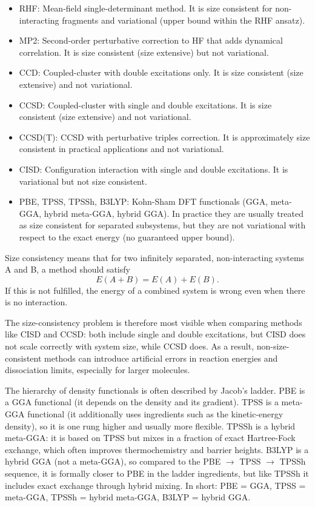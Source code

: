 \documentclass[a4paper,12pt]{scrartcl}
\begin{document}
\begin{itemize}
    \item RHF: Mean-field single-determinant method. It is size consistent for non-interacting fragments and variational (upper bound within the RHF ansatz).
    \item MP2: Second-order perturbative correction to HF that adds dynamical correlation. It is size consistent (size extensive) but not variational.
    \item CCD: Coupled-cluster with double excitations only. It is size consistent (size extensive) and not variational.
    \item CCSD: Coupled-cluster with single and double excitations. It is size consistent (size extensive) and not variational.
    \item CCSD(T): CCSD with perturbative triples correction. It is approximately size consistent in practical applications and not variational.
    \item CISD: Configuration interaction with single and double excitations. It is variational but not size consistent.
    \item PBE, TPSS, TPSSh, B3LYP: Kohn-Sham DFT functionals (GGA, meta-GGA, hybrid meta-GGA, hybrid GGA). In practice they are usually treated as size consistent for separated subsystems, but they are not variational with respect to the exact energy (no guaranteed upper bound).
\end{itemize}

Size consistency means that for two infinitely separated, non-interacting systems A and B, a method should satisfy
\[
E(A + B) = E(A) + E(B).
\]
If this is not fulfilled, the energy of a combined system is wrong even when there is no interaction.

The size-consistency problem is therefore most visible when comparing methods like CISD and CCSD: both include single and double excitations, but CISD does not scale correctly with system size, while CCSD does. As a result, non-size-consistent methods can introduce artificial errors in reaction energies and dissociation limits, especially for larger molecules.

The hierarchy of density functionals is often described by Jacob's ladder. PBE is a GGA functional (it depends on the density and its gradient). TPSS is a meta-GGA functional (it additionally uses ingredients such as the kinetic-energy density), so it is one rung higher and usually more flexible. TPSSh is a hybrid meta-GGA: it is based on TPSS but mixes in a fraction of exact Hartree-Fock exchange, which often improves thermochemistry and barrier heights. B3LYP is a hybrid GGA (not a meta-GGA), so compared to the PBE $\rightarrow$ TPSS $\rightarrow$ TPSSh sequence, it is formally closer to PBE in the ladder ingredients, but like TPSSh it includes exact exchange through hybrid mixing. In short: PBE = GGA, TPSS = meta-GGA, TPSSh = hybrid meta-GGA, B3LYP = hybrid GGA.
\end{document}
